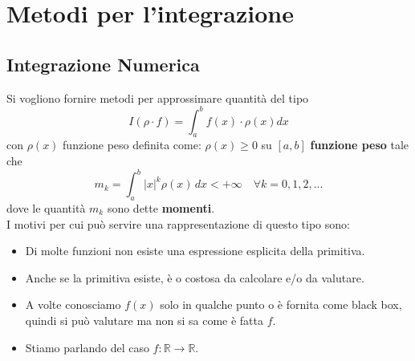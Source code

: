 \documentclass[12pt,a4paper,]{report}
\begin{document}
\chapter{Metodi per l'integrazione}

\begin{lezione}
    [Lezione 16 26/04]
\end{lezione}
\noindent
\section{Integrazione Numerica}
Si vogliono fornire metodi per approssimare quantità del tipo
\[
I(\rho \cdot f) = \int^b_a f(x) \cdot \rho(x) dx
\]
con $\rho(x)$ funzione peso definita come:
$\rho(x) \geq 0$ su $[a, b]$ \textbf{funzione peso} tale che 
\[
m_k = \int_a^b |x|^k \rho(x)\,dx < +\infty \quad \forall k = 0,1,2,...
\]
dove le quantità $m_k$ sono dette \textbf{momenti}.
\\
I motivi per cui può servire una rappresentazione di questo tipo sono:
\begin{itemize}
    \item Di molte funzioni non esiste una espressione esplicita della primitiva.
    \item Anche se la primitiva esiste, è o costosa da calcolare e/o da valutare.
    \item A volte conosciamo $f(x)$ solo in qualche punto o è fornita come black box, quindi si può valutare ma non si sa come è fatta $f$.
    \item Stiamo parlando del caso $f : \mathbb{R} \to \mathbb{R}$.
\end{itemize}
\end{document}
